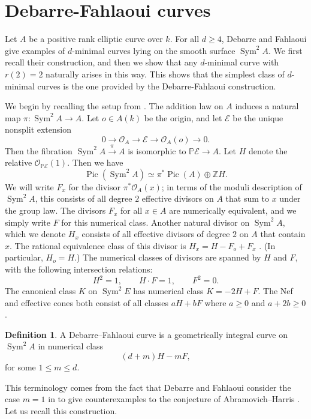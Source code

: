 \documentclass[11pt]{amsart}
\newcommand{\defi}[1]{\textsf{#1}}
\newcommand{\pp}{\mathbb{P}}
\renewcommand{\O}{\mathcal{O}}
\newcommand{\EE}{{\mathscr{E}}}
\DeclareMathOperator{\Pic}{Pic}
\DeclareMathOperator{\Sym}{Sym}
\theoremstyle{definition}
\newtheorem{definition}[theorem]{Definition}
\theoremstyle{remark}
\begin{document}
\section{Debarre-Fahlaoui curves}\label{sec:Debarre-Fahlaoui}

Let $A$ be a positive rank elliptic curve over $k$.
For all $d \geqslant 4$, Debarre and Fahlaoui give examples of $d$-minimal curves lying on the smooth surface $\Sym^2A$.  We first recall their construction, and then we show that any \(d\)-minimal curve with \(r(2) = 2\) naturally arises in this way. This shows that the simplest class of $d$-minimal curves is the one provided by the Debarre-Fahlaoui construction.

We begin by recalling the setup from \cite[Section 4.1]{Debarre-Fahlaoui1993}.
The addition law on $A$ induces a natural map $\pi \colon \Sym^2A \to A$.
Let $o \in A(k)$ be the origin, and let $\EE$ be the unique nonsplit extension
\[ 0 \to \O_A \to \EE \to \O_A(o) \to 0.\]
Then the fibration $\Sym^2A \xrightarrow{\pi} A$ is isomorphic to $\pp \EE \to A$.  Let $H$ denote the relative $\O_{\pp \EE}(1)$.   Then we have 
\[\Pic(\Sym^2A) \simeq \pi^*\Pic(A) \oplus \mathbb{Z} H.\]
We will write $F_x$ for the divisor $\pi^*\O_A(x)$; in terms of the moduli description of $\Sym^2A$, this consists of all degree $2$ effective divisors on $A$ that sum to $x$ under the group law.
The divisors $F_x$ for all $x \in A$ are numerically equivalent, and we simply write $F$ for this numerical class. 
Another natural divisor on $\Sym^2A$, which we denote $H_x$ consists of all effective divisors of degree $2$ on $A$ that contain $x$.  The rational equivalence class of this divisor is
\(H_x = H - F_o + F_x\) \cite[Section 4.1 (ii)]{Debarre-Fahlaoui1993}.
(In particular, $H_o = H$.)
The numerical classes of divisors are spanned by $H$ and $F$, with the following intersection relations:
\[H^2 = 1, \qquad H \cdot F = 1, \qquad F^2 = 0.\]
The canonical class $K$ on $\Sym^2E$ has numerical class
\(K = -2H + F\).
The Nef and effective cones both consist of all classes $aH + bF$ where $a \geqslant 0$ and $a + 2b \geqslant 0$ \cite[Chapter V, Proposition 2.21]{Hartshorne}.

\begin{definition}
A \defi{Debarre--Fahlaoui curve} is a geometrically integral curve on $\Sym^2A$ in numerical class
\[(d+m)H - mF,\]
for some $1 \leqslant m \leqslant d$.
\end{definition}


This terminology comes from the fact that Debarre and Fahlaoui consider the case $m=1$ in \cite{Debarre-Fahlaoui1993} to give counterexamples to the conjecture of Abramovich--Harris \cite[page 229]{Abramovich-Harris1991}.  Let us recall this construction.
\end{document}
